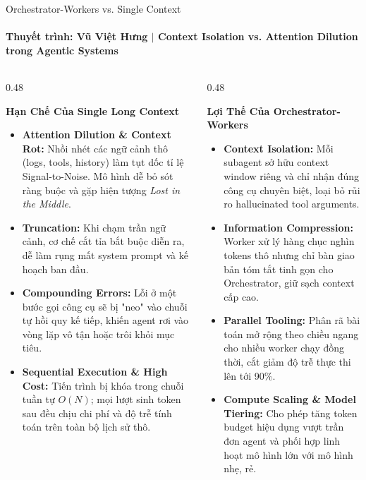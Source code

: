 \documentclass[aspectratio=1610,10pt,xcolor={table}]{beamer}
\begin{document}
\begin{frame}{Orchestrator-Workers vs. Single Context}
  \framesubtitle{Thuyết trình: Vũ Việt Hưng $\vert$ Context Isolation vs. Attention Dilution trong Agentic Systems}

  \begin{columns}[t]
    \begin{column}{0.48\textwidth}
      \begin{alertblock}{\textbf{Hạn Chế Của Single Long Context}}
        \footnotesize
        \begin{itemize}
          \item \textbf{Attention Dilution \& Context Rot:} Nhồi nhét các ngữ cảnh thô (logs, tools, history) làm tụt dốc tỉ lệ Signal-to-Noise. Mô hình dễ bỏ sót ràng buộc và gặp hiện tượng \textit{Lost in the Middle}.
          \item \textbf{Truncation:} Khi chạm trần ngữ cảnh, cơ chế cắt tỉa bắt buộc diễn ra, dễ làm rụng mất system prompt và kế hoạch ban đầu.
          \item \textbf{Compounding Errors:} Lỗi ở một bước gọi công cụ sẽ bị "neo" vào chuỗi tự hồi quy kế tiếp, khiến agent rơi vào vòng lặp vô tận hoặc trôi khỏi mục tiêu.
          \item \textbf{Sequential Execution \& High Cost:} Tiến trình bị khóa trong chuỗi tuần tự $O(N)$; mọi lượt sinh token sau đều chịu chi phí và độ trễ tính toán trên toàn bộ lịch sử thô.
        \end{itemize}
      \end{alertblock}
    \end{column}

    \begin{column}{0.48\textwidth}
      \begin{block}{\textbf{Lợi Thế Của Orchestrator-Workers}}
        \footnotesize
        \begin{itemize}
          \item \textbf{Context Isolation:} Mỗi subagent sở hữu context window riêng và chỉ nhận đúng công cụ chuyên biệt, loại bỏ rủi ro hallucinated tool arguments.
          \item \textbf{Information Compression:} Worker xử lý hàng chục nghìn tokens thô nhưng chỉ bàn giao bản tóm tắt tinh gọn cho Orchestrator, giữ sạch context cấp cao.
          \item \textbf{Parallel Tooling:} Phân rã bài toán mở rộng theo chiều ngang cho nhiều worker chạy đồng thời, cắt giảm độ trễ thực thi lên tới 90\%.
          \item \textbf{Compute Scaling \& Model Tiering:} Cho phép tăng token budget hiệu dụng vượt trần đơn agent và phối hợp linh hoạt mô hình lớn với mô hình nhẹ, rẻ.
        \end{itemize}
      \end{block}
    \end{column}
  \end{columns}
\end{frame}
\end{document}
